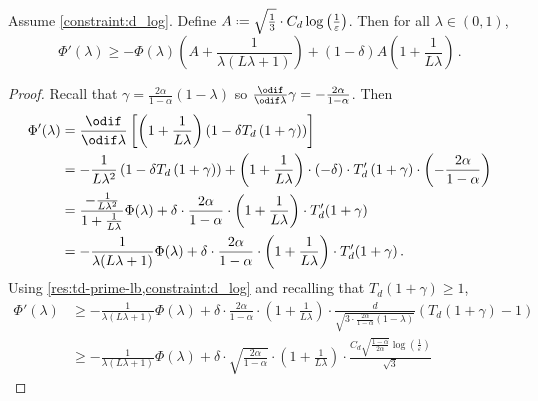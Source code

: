 \documentclass{theoretics}
\newcommand*{\define}{\mathrel{\vcenter{\baselineskip0.5ex \lineskiplimit0pt
                      \hbox{\scriptsize.}\hbox{\scriptsize.}}}%
                      =}
\renewcommand{\epsilon}{\varepsilon}
\begin{document}
\begin{lemma}
    \label{res:phi-differential-ineq}
    Assume \cref{constraint:d_log}. Define $A \define \sqrt{\tfrac{1}{3}} \cdot C_d
\log\left(\tfrac{1}{\epsilon}\right)$. Then for all $\lambda \in (0, 1)$,
    \[
        \Phi'(\lambda)
        \ge -\Phi(\lambda)
            \left( A + \frac{1}{\lambda (L\lambda + 1)} \right)
            + (1-\delta)A \left( 1 + \frac{1}{L\lambda} \right) \,.
    \]
\end{lemma}
\begin{proof}
    Recall that $\gamma = \frac{2\alpha}{1-\alpha}(1-\lambda)$ so $\tfrac{\odif}{\odif
\lambda}\gamma = -\frac{2\alpha}{1-\alpha}$. Then
    \begin{align*}
        \Phi'(\lambda) 
        &= \frac{\odif}{\odif \lambda} \left[
            \left(1 + \frac{1}{L \lambda}\right)
            \left(1 - \delta T_d\left(1 + \gamma\right)\right)
        \right] \\
        &= -\frac{1}{L \lambda^2}
                \left(1 - \delta T_d\left(1 + \gamma \right)\right)
            + \left(1 + \frac{1}{L \lambda}\right) \cdot (-\delta) \cdot
                T_d'\left(1 + \gamma \right) \cdot
                \left( -\frac{2\alpha}{1-\alpha} \right) \\
        &= \frac{-\frac{1}{L \lambda^2}}{1 + \frac{1}{L\lambda}} \Phi(\lambda)
            + \delta \cdot \frac{2\alpha}{1-\alpha} \cdot
            \left(1 + \frac{1}{L \lambda}\right) \cdot T_d'(1+\gamma) \\
        &= -\frac{1}{\lambda (L\lambda+1)} \Phi(\lambda)
            + \delta \cdot \frac{2\alpha}{1-\alpha} \cdot
            \left(1 + \frac{1}{L \lambda}\right) \cdot T_d'(1+\gamma) \,.
    \end{align*}
    Using \cref{res:td-prime-lb,constraint:d_log} and recalling that $T_d(1+\gamma) \ge 1$,
    \begin{align*}
        \Phi'(\lambda)
        &\ge -\frac{1}{\lambda (L\lambda+1)} \Phi(\lambda)
            + \delta \cdot \frac{2\alpha}{1-\alpha} \cdot
            \left(1 + \frac{1}{L \lambda}\right) \cdot
                \frac{d}{\sqrt{3 \cdot \frac{2\alpha}{1-\alpha}(1-\lambda)}}
                \left(T_d(1+\gamma) - 1\right) \\
        &\ge -\frac{1}{\lambda (L\lambda+1)} \Phi(\lambda)
            + \delta \cdot \sqrt{\frac{2\alpha}{1-\alpha}} \cdot
            \left(1 + \frac{1}{L \lambda}\right) \cdot
                \frac{C_d \sqrt{\frac{1-\alpha}{2\alpha}} \log \left(\frac{1}{\epsilon} \right)}{\sqrt{3}}

\end{align*}
\end{proof}
\end{document}
